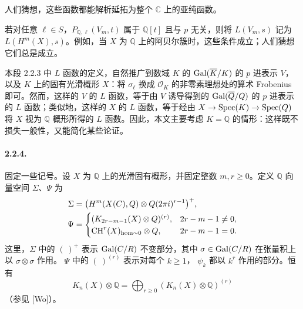 人们猜想，这些函数都能解析延拓为整个 $\mathbb C$ 上的亚纯函数。

若对任意 $\ell\in S$，$P_{\mathbb Q,\ell}(V_m,t)$ 属于 $\mathbb Q[t]$ 且与 $p$ 无关，则将
$L(V_m,s)$ 记为 $L(H^m(X),s)$。例如，当 $X$ 为 $\mathbb Q$ 上的阿贝尔簇时，这些条件成立；人们猜想它们总是成立。

本段 2.2.3 中 $L$ 函数的定义，自然推广到数域 $K$ 的
$\operatorname{Gal}(\overline K/K)$ 的 $p$ 进表示 $V$，以及 $K$ 上的固有光滑概形 $X$：将 $\sigma_\ell$ 换成
$\mathcal O_K$ 的非零素理想处的算术 Frobenius 即可。然而，这样的 $V$ 的 $L$ 函数，等于由 $V$ 诱导得到的
$\operatorname{Gal}(\overline{Q}/Q)$ 的 $p$ 进表示的 $L$ 函数；类似地，这样的 $X$ 的 $L$ 函数，等于经由
$X\to\operatorname{Spec}(K)\to\operatorname{Spec}(Q)$ 将 $X$ 视为 $\mathbb Q$ 概形所得的 $L$ 函数。因此，本文主要考虑 $K=\mathbb Q$ 的情形：这样既不损失一般性，又能简化某些论证。

\paragraph{2.2.4.}
固定一些记号。设 $X$ 为 $\mathbb Q$ 上的光滑固有概形，并固定整数 $m,r\geq0$。定义 $\mathbb Q$ 向量空间 $\Sigma$、$\Psi$ 为
\begin{align*}
\Sigma&=\bigl(H^m(X(C),Q)\otimes
Q(2\pi i)^{r-1}\bigr)^+,\\
\Psi&=\begin{cases}
(K_{2r-m-1}(X)\otimes Q)^{(r)},&2r-m-1\ne0,\\
\operatorname{CH}^r(X)_{\mathrm{hom}\sim0}\otimes Q,&2r-m-1=0.
\end{cases}
\end{align*}
这里，$\Sigma$ 中的 $(\ )^+$ 表示 $\operatorname{Gal}(C/R)$ 不变部分，其中
$\sigma\in\operatorname{Gal}(C/R)$ 在张量积上以 $\sigma\otimes\sigma$ 作用。
$\Psi$ 中的 $(\ )^{(r)}$ 表示对每个 $k\geq1$， $\psi_k$ 都以 $k^r$ 作用的部分。恒有
\[
K_n(X)\otimes\mathbb Q
=\bigoplus_{r\geq0}(K_n(X)\otimes\mathbb Q)^{(r)}
\]
（参见 [Wo]）。
